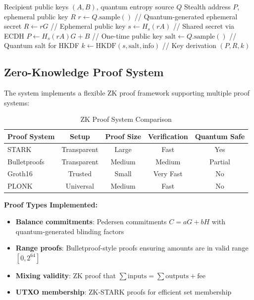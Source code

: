 \documentclass[12pt,a4paper]{article}
\begin{document}
\begin{algorithm}
\caption{Quantum-Enhanced Stealth Address Generation}
\begin{algorithmic}[1]
\REQUIRE Recipient public keys $(A, B)$, quantum entropy source $Q$
\ENSURE Stealth address $P$, ephemeral public key $R$
\STATE $r \leftarrow Q.\text{sample}()$ // Quantum-generated ephemeral secret
\STATE $R \leftarrow rG$ // Ephemeral public key
\STATE $s \leftarrow H_s(rA)$ // Shared secret via ECDH
\STATE $P \leftarrow H_s(rA)G + B$ // One-time public key
\STATE $\text{salt} \leftarrow Q.\text{sample}()$ // Quantum salt for HKDF
\STATE $k \leftarrow \text{HKDF}(s, \text{salt}, \text{info})$ // Key derivation
\RETURN $(P, R, k)$
\end{algorithmic}
\end{algorithm}

\subsection{Zero-Knowledge Proof System}

The system implements a flexible ZK proof framework supporting multiple proof systems:

\begin{table}[h]
\centering
\begin{tabular}{lcccc}
\toprule
Proof System & Setup & Proof Size & Verification & Quantum Safe \\
\midrule
STARK & Transparent & Large & Fast & Yes \\
Bulletproofs & Transparent & Medium & Medium & Partial \\
Groth16 & Trusted & Small & Very Fast & No \\
PLONK & Universal & Medium & Fast & No \\
\bottomrule
\end{tabular}
\caption{ZK Proof System Comparison}
\end{table}

\textbf{Proof Types Implemented:}
\begin{itemize}
\item \textbf{Balance commitments}: Pedersen commitments $C = aG + bH$ with quantum-generated blinding factors
\item \textbf{Range proofs}: Bulletproof-style proofs ensuring amounts are in valid range $[0, 2^{64}]$
\item \textbf{Mixing validity}: ZK proof that $\sum \text{inputs} = \sum \text{outputs} + \text{fee}$
\item \textbf{UTXO membership}: ZK-STARK proofs for efficient set membership
\end{itemize}
\end{document}
